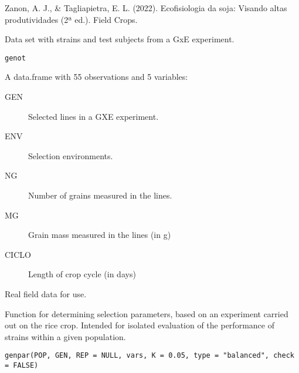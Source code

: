 \documentclass[a4paper]{book}
\begin{document}
%
\begin{References}
Zanon, A. J., \& Tagliapietra, E. L. (2022). Ecofisiologia da soja:
Visando altas produtividades (2ª ed.). Field Crops.
\end{References}
%
\begin{Description}
Data set with strains and test subjects from a GxE experiment.
\end{Description}
%
\begin{Usage}
\begin{verbatim}
genot
\end{verbatim}
\end{Usage}
%
\begin{Format}
A data.frame with 55 observations and 5 variables:
\begin{description}

\item[GEN] Selected lines in a GXE experiment.
\item[ENV] Selection environments.
\item[NG] Number of grains measured in the lines.
\item[MG] Grain mass measured in the lines (in g)
\item[CICLO] Length of crop cycle (in days)

\end{description}

\end{Format}
%
\begin{Source}
Real field data for use.
\end{Source}
%
\begin{Description}
Function for determining selection parameters, based on an experiment
carried out on the rice crop. Intended for isolated evaluation of the performance
of strains within a given population.
\end{Description}
%
\begin{Usage}
\begin{verbatim}
genpar(POP, GEN, REP = NULL, vars, K = 0.05, type = "balanced", check = FALSE)
\end{verbatim}
\end{Usage}
%
\end{document}

